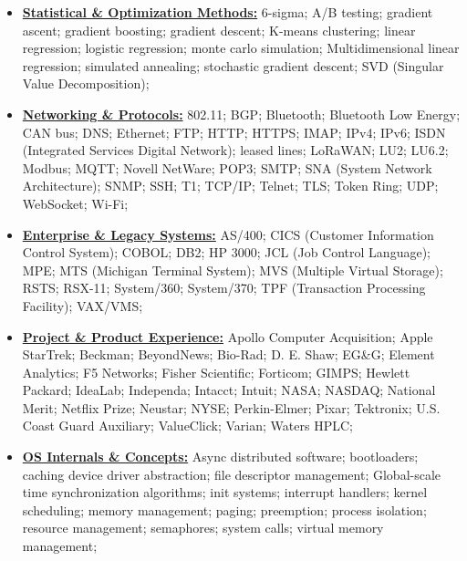 \documentclass[letterpaper,11pt]{article}
\begin{document}
\begin{multicols}{4}
{\begin{itemize}[leftmargin=0.1in, label={}, itemsep=0pt, parsep=0pt, topsep=0pt, partopsep=0pt]
DirectX;
DisplayPort;
dropping frames;
FFmpeg;
graphics performance;
H.264;
HDMI;
jitter;
latency;
NVENC;
OpenGL;
sound card drivers;
VGA drivers;
Video Capture;
Video Capture Card Drivers;
Video Capture Cards;
Video Compression;
Video Decompression;
video pipeline;
video transcoding;
WebRTC;
YUV;
\item
\textbf{\uline{Statistical \& Optimization Methods:}} \hspace{0pt}
6-sigma;
A/B testing;
gradient ascent;
gradient boosting;
gradient descent;
K-means clustering;
linear regression;
logistic regression;
monte carlo simulation;
Multidimensional linear regression;
simulated annealing;
stochastic gradient descent;
SVD (Singular Value Decomposition);
\item
\textbf{\uline{Networking \& Protocols:}} \hspace{0pt}
802.11;
BGP;
Bluetooth;
Bluetooth Low Energy;
CAN bus;
DNS;
Ethernet;
FTP;
HTTP;
HTTPS;
IMAP;
IPv4;
IPv6;
ISDN (Integrated Services Digital Network);
leased lines;
LoRaWAN;
LU2;
LU6.2;
Modbus;
MQTT;
Novell NetWare;
POP3;
SMTP;
SNA (System Network Architecture);
SNMP;
SSH;
T1;
TCP/IP;
Telnet;
TLS;
Token Ring;
UDP;
WebSocket;
Wi-Fi;

\item
\textbf{\uline{Enterprise \& Legacy Systems:}} \hspace{0pt}
AS/400;
CICS (Customer Information Control System);
COBOL;
DB2;
HP 3000;
JCL (Job Control Language);
MPE;
MTS (Michigan Terminal System);
MVS (Multiple Virtual Storage);
RSTS;
RSX-11;
System/360;
System/370;
TPF (Transaction Processing Facility);
VAX/VMS;

\item
\textbf{\uline{Project \& Product Experience:}} \hspace{0pt}
Apollo Computer Acquisition;
Apple StarTrek;
Beckman;
BeyondNews;
Bio-Rad;
D. E. Shaw;
EG\&G;
Element Analytics;
F5 Networks;
Fisher Scientific;
Forticom;
GIMPS;
Hewlett Packard;
IdeaLab;
Independa;
Intacct;
Intuit;
NASA;
NASDAQ;
National Merit;
Netflix Prize;
Neustar;
NYSE;
Perkin-Elmer;
Pixar;
Tektronix;
U.S. Coast Guard Auxiliary;
ValueClick;
Varian;
Waters HPLC;

\item
\textbf{\uline{OS Internals \& Concepts:}} \hspace{0pt}
Async distributed software;
bootloaders;
caching
device driver abstraction;
file descriptor management;
Global-scale time synchronization algorithms;
init systems;
interrupt handlers;
kernel scheduling;
memory management;
paging;
preemption;
process isolation;
resource management;
semaphores;
system calls;
virtual memory management;


\end{itemize}}
\end{multicols}
\end{document}
